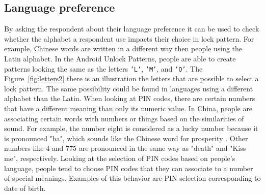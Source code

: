       \subsection*{Language preference}
      By asking the respondent about their language preference it can be used to check whether the alphabet a respondent use impacts their choice in lock pattern. For example, Chinese words are written in a different way then people using the Latin alphabet. In the Android Unlock Patterns, people are able to create patterns looking the same as the letters \texttt{'L'}, \texttt{'M'}, and \texttt{'O'}. The Figure~\ref{fig:letters2} there is an illustration the letters that are possible to select a lock pattern. The same possibility could be found in languages using a different alphabet than the Latin. When looking at PIN codes, there are certain numbers that have a different meaning than only its numeric value. In China, people are associating certain words with numbers or things based on the similarities of sound. For example, the number eight is considered as a lucky number because it is pronounced "ba", which sounds like the Chinese word for prosperity \cite{ChineseChatCodes}. Other numbers like 4 and 775 are pronounced in the same way as "death" and "Kiss me", respectively. Looking at the selection of PIN codes based on people's language, people tend to choose PIN codes that they can associate to a number of special meanings. Examples of this behavior are PIN selection corresponding to date of birth. 

